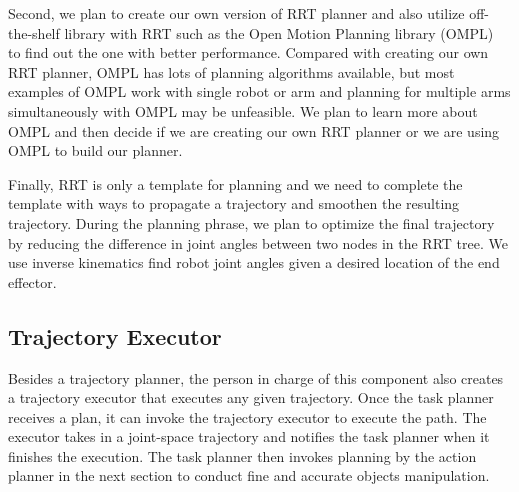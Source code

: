 Second, we plan to create our own version of RRT planner and also utilize off-the-shelf library with RRT such as the Open Motion Planning library (OMPL)~\cite{sucan2012the-open-motion-planning-library} to find out the one with better performance.
Compared with creating our own RRT planner, OMPL has lots of planning algorithms available, but most examples of OMPL work with single robot or arm and planning for multiple arms simultaneously with OMPL may be unfeasible. We plan to learn more about OMPL and then decide if we are creating our own RRT planner or we are using OMPL to build our planner.

Finally, RRT is only a template for planning and we need to complete the template with ways to propagate a trajectory and smoothen the resulting trajectory. 
During the planning phrase, we plan to optimize the final trajectory by reducing the difference in joint angles between two nodes in the RRT tree. We use inverse kinematics find robot joint angles given a desired location of the end effector.






\subsection{Trajectory Executor}

Besides a trajectory planner, the person in charge of this component also creates a trajectory executor that executes any given trajectory.
Once the task planner receives a plan, it can invoke the trajectory executor to execute the path. The executor takes in a joint-space trajectory and notifies the task planner when it finishes the execution. The task planner then invokes planning by the action planner in the next section to conduct fine and accurate objects manipulation.
